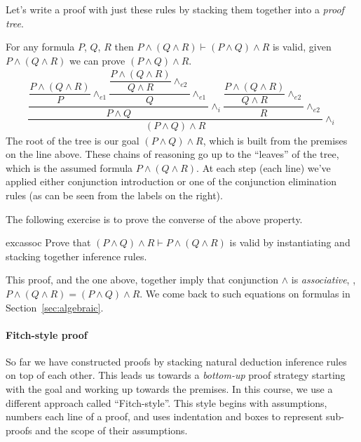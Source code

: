 Let's write a proof with just these rules by stacking them together
into a \emph{proof tree}.

\begin{example}
\label{exm:assoc-conj}
  For any formula $P$, $Q$, $R$ then $P \wedge (Q \wedge
  R) \vdash (P \wedge Q) \wedge R$ is valid, \ie{} given $P \wedge (Q \wedge
  R)$ we can prove $(P \wedge Q) \wedge R$.
%
\newcommand{\conge}[1]{\wedge_{e#1}}
  \begin{align*}
    \dfrac{
    \dfrac{\dfrac{P \wedge (Q \wedge R)}
    {P}\conge{1}
    \dfrac{\dfrac{P \wedge (Q \wedge R)}
    {Q \wedge R} \conge{2}}{Q} \conge{1}}
    {P \wedge Q} {\wedge_i}
    \dfrac{\dfrac{P \wedge (Q \wedge R)}
    {Q \wedge R} \conge{2}}{R} \conge{2}}
    {(P \wedge Q) \wedge R} {\wedge_i}
  \end{align*}
The root of the tree is our goal $(P \wedge Q) \wedge R$, which is
built from the premises on the line above. These chains of reasoning
go up to the ``leaves'' of the tree, which is the assumed formula
$P \wedge (Q \wedge R)$. At each step (each line) we've applied
either conjunction introduction or one of the conjunction elimination
rules (as can be seen from the labels on the right).
\end{example}
\noindent
The following exercise is to prove the converse of the above property.
%
\begin{restatable}{exc}{assoc}
  \label{exm:assoc}
  Prove that $(P \wedge Q) \wedge R \vdash P \wedge (Q \wedge R)$ is
  valid by instantiating and stacking together inference rules.
\end{restatable}
%
This proof, and the one above, together imply that conjunction
$\wedge$ is \emph{associative}, \ie{},
$P \wedge (Q \wedge R) = (P \wedge Q) \wedge R$. We come back
to such equations on formulas in Section~\ref{sec:algebraic}.

\paragraph{Fitch-style proof}
So far we have constructed proofs by stacking natural
deduction inference rules on top of each other. This leads us towards a
\emph{bottom-up} proof strategy starting with the goal and working up
towards the premises. In this course, we use a different
approach called ``Fitch-style''. This style begins
with assumptions, numbers each line of a proof, and uses indentation
and boxes to represent sub-proofs and the scope of their assumptions.

